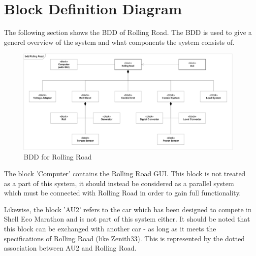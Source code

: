 \section{Block Definition Diagram}
The following section shows the BDD of Rolling Road. The BDD is used to give a generel overview of the system and what components the system consists of. 

\begin{figure}[H]
	\centering
	\includegraphics[width=1\linewidth]{Architecture/Diagrams/BDD_RR}
	\caption{BDD for Rolling Road}
	\label{fig:RR_BDD}
\end{figure}

The block 'Computer' contains the Rolling Road GUI. This block is not treated as a part of this system, it should instead be considered as a parallel system which must be connected with Rolling Road in order to gain full functionality.

Likewise, the block 'AU2' refers to the car which has been designed to compete in Shell Eco Marathon and is not part of this system either. It should be noted that this block can be exchanged with another car - as long as it meets the specifications of Rolling Road (like Zenith33\cite{BAC_zenith33}). This is represented by the dotted association between AU2 and Rolling Road.